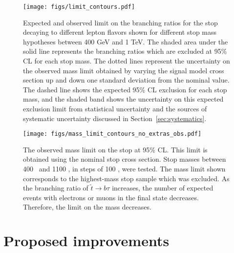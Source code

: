 \begin{figure}[ht]
  \centering
  \texttt{[image: figs/limit\_contours.pdf]}
  \caption{Expected and observed limit on the branching ratios for the stop
    decaying to different lepton flavors shown for different stop mass
    hypotheses between 400 GeV and 1 TeV. The shaded area under the solid
    line represents the branching ratios which are excluded at 95\% CL
    for each stop mass.
    The dotted lines represent the uncertainty on the observed mass limit
    obtained by varying the signal model cross section up and down one standard
    deviation from the nominal value. The dashed line shows the
    expected 95\% CL exclusion for each stop mass, and the shaded band shows
    the uncertainty on this expected exclusion limit from statistical
    uncertainty and the sources of systematic uncertainty discussed in
    Section~\ref{sec:systematics}.
  }
  \label{fig:limit_contours}
\end{figure}

\begin{figure}[ht]
  \centering
  \texttt{[image: figs/mass\_limit\_contours\_no\_extras\_obs.pdf]}
  \caption{The observed mass limit on the stop at 95\% CL.
    This limit is obtained using the nominal stop cross section.
    Stop masses between 400 \GeV\ and 1100 \GeV, in steps of 100 \GeV, were
    tested. The mass limit shown corresponds to the highest-mass stop sample
    which was excluded.
    As the branching ratio of $\tilde{t} \rightarrow b\tau$ increases, the
    number of expected events with electrons or muons in the final state
    decreases. Therefore, the limit on the mass decreases.
  }
  \label{fig:mass_limit_obs}
\end{figure}

\section{Proposed improvements}
\label{sec:improvements}

